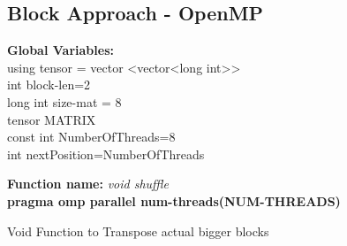 \documentclass[10pt,journal]{article}
\begin{document}
\subsection{Block Approach - OpenMP}
\textbf{Global Variables:} \\

using tensor = vector <vector<long int>>\\
int block-len=2\\
long int size-mat = 8\\
tensor MATRIX\\
const int NumberOfThreads=8\\
int nextPosition=NumberOfThreads\\


\begin{algorithm}[H]
\SetAlgoLined
\textbf{Function name:} \emph{void shuffle}\\

\vspace{10pt} 
    \textbf{pragma omp parallel num-threads(NUM-THREADS)}

\caption{Void Function to Transpose actual bigger blocks}
\end{algorithm}
\end{document}

